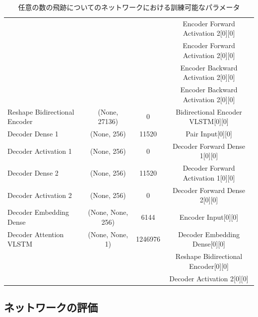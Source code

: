 \begin{table}[htb]
{\begin{tabular}{l c c c}
                                                                                                         &&&Encoder Forward Activation 2[0][0]\\       
                                                                                                         &&&Encoder Forward Activation 2[0][0]\\       
                                                                                                         &&&Encoder Backward Activation 2[0][0]\\     
                                                                                                         &&&Encoder Backward Activation 2[0][0]\\ \hline
    Reshape Bidirectional Encoder & (None, 27136) & 0 & Bidirectional Encoder VLSTM[0][0]\\\hline\hline
    Decoder Dense 1 & (None, 256)　& 11520 & Pair Input[0][0]\\\hline
    Decoder Activation 1 & (None, 256)　& 0 & Decoder Forward Dense 1[0][0]\\\hline
    Decoder Dense 2 & (None, 256)　& 11520 & Decoder Forward Activation 1[0][0]\\\hline
    Decoder Activation 2 & (None, 256)　& 0 & Decoder Forward Dense 2[0][0]\\\hline\hline
    Decoder Embedding Dense & (None, None, 256) & 6144 & Encoder Input[0][0]\\\hline\hline
    Decoder Attention VLSTM & (None, None, 1) & 1246976 & Decoder Embedding Dense[0][0]\\
                                                                                                   &&& Reshape Bidirectional Encoder[0][0]\\                    
                                                                                                   &&& Decoder Activation 2[0][0]\\\hline\hline
  \end{tabular}
  }
  \caption{任意の数の飛跡についてのネットワークにおける訓練可能なパラメータ}
  \label{ParametersforVLSTMModel}
\end{table}


\subsection{ネットワークの評価} \label{Net:VLSTM:PerformanceofVLSTM}

